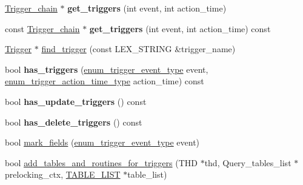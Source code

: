 \begin{DoxyCompactItemize}
\mbox{\label{classTable__trigger__dispatcher_a8a2fc59f2f950c6894a2f56df7bf8ef2}} 
\mbox{\hyperlink{classTrigger__chain}{Trigger\+\_\+chain}} $\ast$ {\bfseries get\+\_\+triggers} (int event, int action\+\_\+time)
\item 
\mbox{\label{classTable__trigger__dispatcher_a6ee06725e3f36793038c2710a01abf97}} 
const \mbox{\hyperlink{classTrigger__chain}{Trigger\+\_\+chain}} $\ast$ {\bfseries get\+\_\+triggers} (int event, int action\+\_\+time) const
\item 
\mbox{\hyperlink{classTrigger}{Trigger}} $\ast$ \mbox{\hyperlink{classTable__trigger__dispatcher_a4e5577ae97ad916d06595957f4624482}{find\+\_\+trigger}} (const L\+E\+X\+\_\+\+S\+T\+R\+I\+NG \&trigger\+\_\+name)
\item 
\mbox{\label{classTable__trigger__dispatcher_a248d5fb43a2ca9b54b9f28dd3e73e6f0}} 
bool {\bfseries has\+\_\+triggers} (\mbox{\hyperlink{trigger__def_8h_a25c92abc3a183d6950b0d9a4ee846e5e}{enum\+\_\+trigger\+\_\+event\+\_\+type}} event, \mbox{\hyperlink{trigger__def_8h_ace20981b1217cca2d3a23e2338fd61b9}{enum\+\_\+trigger\+\_\+action\+\_\+time\+\_\+type}} action\+\_\+time) const
\item 
\mbox{\label{classTable__trigger__dispatcher_a187795de5eecc9c1b6253a27fd4be51c}} 
bool {\bfseries has\+\_\+update\+\_\+triggers} () const
\item 
\mbox{\label{classTable__trigger__dispatcher_a705772b186de3e35f089d07bb5ec4532}} 
bool {\bfseries has\+\_\+delete\+\_\+triggers} () const
\item 
bool \mbox{\hyperlink{classTable__trigger__dispatcher_a644865f63c596311fc869e5b7c0d43e6}{mark\+\_\+fields}} (\mbox{\hyperlink{trigger__def_8h_a25c92abc3a183d6950b0d9a4ee846e5e}{enum\+\_\+trigger\+\_\+event\+\_\+type}} event)
\item 
bool \mbox{\hyperlink{classTable__trigger__dispatcher_acd9e2a58e8728a599a2345f1b157f24c}{add\+\_\+tables\+\_\+and\+\_\+routines\+\_\+for\+\_\+triggers}} (T\+HD $\ast$thd, Query\+\_\+tables\+\_\+list $\ast$prelocking\+\_\+ctx, \mbox{\hyperlink{structTABLE__LIST}{T\+A\+B\+L\+E\+\_\+\+L\+I\+ST}} $\ast$table\+\_\+list)
\item 

\end{DoxyCompactItemize}
